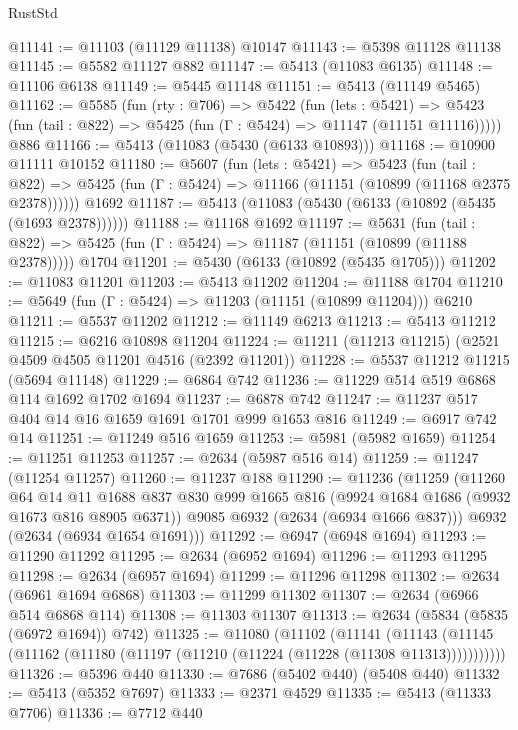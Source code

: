 \begin{lexlean}{RustStd}
\begin{coremodule}
@11141 := @11103 (@11129 @11138) @10147
@11143 := @5398 @11128 @11138
@11145 := @5582 @11127 @882
@11147 := @5413 (@11083 @6135)
@11148 := @11106 @6138
@11149 := @5445 @11148
@11151 := @5413 (@11149 @5465)
@11162 := @5585
    (fun (rty : @706) =>
    @5422
      (fun (lets : @5421) =>
      @5423 (fun (tail : @822) => @5425 (fun (Γ : @5424) => @11147 (@11151 @11116)))))
    @886
@11166 := @5413 (@11083 (@5430 (@6133 @10893)))
@11168 := @10900 @11111 @10152
@11180 := @5607
    (fun (lets : @5421) =>
    @5423
      (fun (tail : @822) =>
      @5425 (fun (Γ : @5424) => @11166 (@11151 (@10899 (@11168 @2375 @2378))))))
    @1692
@11187 := @5413 (@11083 (@5430 (@6133 (@10892 (@5435 (@1693 @2378))))))
@11188 := @11168 @1692
@11197 := @5631
    (fun (tail : @822) => @5425 (fun (Γ : @5424) => @11187 (@11151 (@10899 (@11188 @2378)))))
    @1704
@11201 := @5430 (@6133 (@10892 (@5435 @1705)))
@11202 := @11083 @11201
@11203 := @5413 @11202
@11204 := @11188 @1704
@11210 := @5649 (fun (Γ : @5424) => @11203 (@11151 (@10899 @11204))) @6210
@11211 := @5537 @11202
@11212 := @11149 @6213
@11213 := @5413 @11212
@11215 := @6216 @10898 @11204
@11224 := @11211 (@11213 @11215) (@2521 @4509 @4505 @11201 @4516 (@2392 @11201))
@11228 := @5537 @11212 @11215 (@5694 @11148)
@11229 := @6864 @742
@11236 := @11229 @514 @519 @6868 @114 @1692 @1702 @1694
@11237 := @6878 @742
@11247 := @11237 @517 @404 @14 @16 @1659 @1691 @1701 @999 @1653 @816
@11249 := @6917 @742 @14
@11251 := @11249 @516 @1659
@11253 := @5981 (@5982 @1659)
@11254 := @11251 @11253
@11257 := @2634 (@5987 @516 @14)
@11259 := @11247 (@11254 @11257)
@11260 := @11237 @188
@11290 := @11236
    (@11259
      (@11260
        @64
        @14
        @11
        @1688
        @837
        @830
        @999
        @1665
        @816
        (@9924 @1684 @1686 (@9932 @1673 @816 @8905 @6371))
        @9085
        @6932
        (@2634 (@6934 @1666 @837)))
      @6932
      (@2634 (@6934 @1654 @1691)))
@11292 := @6947 (@6948 @1694)
@11293 := @11290 @11292
@11295 := @2634 (@6952 @1694)
@11296 := @11293 @11295
@11298 := @2634 (@6957 @1694)
@11299 := @11296 @11298
@11302 := @2634 (@6961 @1694 @6868)
@11303 := @11299 @11302
@11307 := @2634 (@6966 @514 @6868 @114)
@11308 := @11303 @11307
@11313 := @2634 (@5834 (@5835 (@6972 @1694)) @742)
@11325 := @11080
    (@11102
      (@11141
        (@11143 (@11145 (@11162 (@11180 (@11197 (@11210 (@11224 (@11228 (@11308 @11313)))))))))))
@11326 := @5396 @440
@11330 := @7686 (@5402 @440) (@5408 @440)
@11332 := @5413 (@5352 @7697)
@11333 := @2371 @4529
@11335 := @5413 (@11333 @7706)
@11336 := @7712 @440

\end{coremodule}
\end{lexlean}
